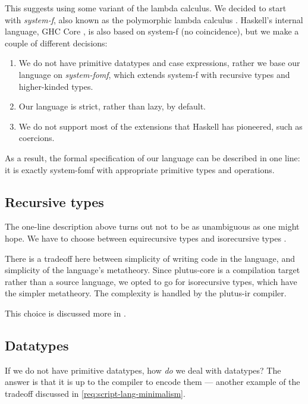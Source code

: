 \documentclass[plutus.tex]{subfiles}
\begin{document}
This suggests using some variant of the lambda calculus.
We decided to start with \emph{\gls{system-f}}, also known as the polymorphic lambda calculus \autocite{Girard-thesis}.
Haskell's internal language, GHC Core \parencite{jones1998transformation}, is also based on \gls{system-f} (no coincidence), but we make a couple of different decisions:
\begin{enumerate}
  \item We do not have primitive datatypes and case expressions, rather we base our language on \emph{\gls{system-fomf}}, which extends \gls{system-f} with recursive types and higher-kinded types.
  \item Our language is strict, rather than lazy, by default.
  \item We do not support most of the extensions that Haskell has pioneered, such as coercions.
\end{enumerate}

As a result, the formal specification of our language can be described in one line: it is exactly \gls{system-fomf} with appropriate primitive types and operations.


\subsection{Recursive types}

The one-line description above turns out not to be as unambiguous as one might hope. We have
to choose between equirecursive types and isorecursive types \autocite[chapter 21]{pierce2002types}.

There is a tradeoff here between simplicity of writing code in the language, and simplicity of the language's metatheory.
Since \gls{plutus-core} is a compilation target rather than a source language, we opted to go for isorecursive types, which have the simpler metatheory.
The complexity is handled by the \gls{plutus-ir} compiler.

This choice is discussed more in \textcite{plutus-core-spec, peytonjones2019unraveling}.

\subsection{Datatypes}
If we do not have primitive datatypes, how \emph{do} we deal with datatypes?
The answer is that it is up to the compiler to encode them --- another example of the tradeoff discussed in \cref{req:script-lang-minimalism}.
\end{document}

